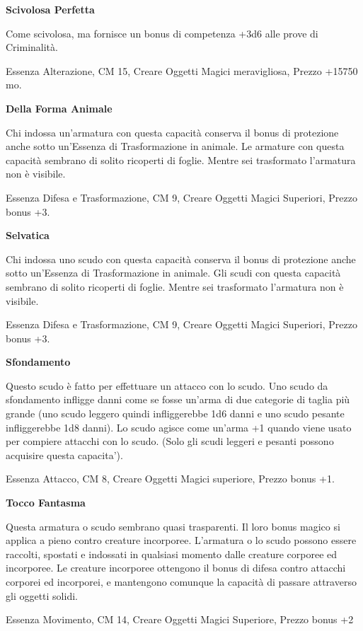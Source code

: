 \documentclass[a4paper,11pt,twoside,openany]{book}
\begin{document}
{\textbf{Scivolosa Perfetta}

Come scivolosa, ma fornisce un bonus di competenza +3d6 alle prove di Criminalità.

Essenza Alterazione, CM 15, Creare Oggetti Magici meravigliosa, Prezzo +15750 mo.

\textbf{Della Forma Animale}

Chi indossa un'armatura con questa capacità conserva il bonus di protezione anche sotto un'Essenza di Trasformazione in animale. Le armature con questa capacità sembrano di solito ricoperti di foglie. Mentre sei trasformato l'armatura non è visibile.

Essenza Difesa e Trasformazione, CM 9, Creare Oggetti Magici Superiori, Prezzo bonus +3.

\textbf{Selvatica}

Chi indossa uno scudo con questa capacità conserva il bonus di protezione anche sotto un'Essenza di Trasformazione in animale. Gli scudi con questa capacità sembrano di solito ricoperti di foglie. Mentre sei trasformato l'armatura non è visibile.

Essenza Difesa e Trasformazione, CM 9, Creare Oggetti Magici Superiori, Prezzo bonus +3.

\textbf{Sfondamento}

Questo scudo è fatto per effettuare un attacco con lo scudo. Uno scudo da sfondamento infligge danni come se fosse un'arma di due categorie di taglia più grande (uno scudo leggero quindi infliggerebbe 1d6 danni e uno scudo pesante infliggerebbe 1d8 danni). Lo scudo agisce come un'arma +1 quando viene usato per compiere attacchi con lo scudo. (Solo gli scudi leggeri e pesanti possono acquisire questa capacita').

Essenza Attacco, CM 8, Creare Oggetti Magici superiore, Prezzo bonus +1.

\textbf{Tocco Fantasma}

Questa armatura o scudo sembrano quasi trasparenti. Il loro bonus magico si applica a pieno contro creature incorporee. L'armatura o lo scudo possono essere raccolti, spostati e indossati in qualsiasi momento dalle creature corporee ed incorporee. Le creature incorporee ottengono il bonus di difesa contro attacchi corporei ed incorporei, e mantengono comunque la capacità di passare attraverso gli oggetti solidi.

Essenza Movimento, CM 14, Creare Oggetti Magici Superiore, Prezzo bonus +2

}
\end{document}
